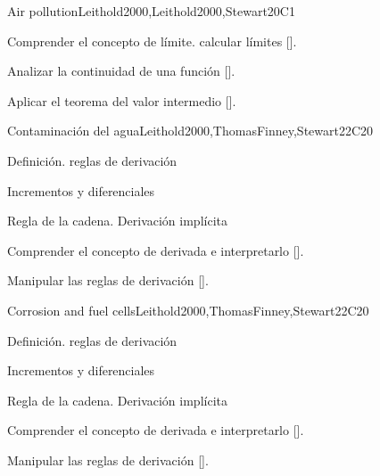 \begin{syllabus}
\begin{unit}{}{Air pollution}{Leithold2000,Leithold2000,Stewart}{20}{C1}
   \begin{learningoutcomes}
      \item Comprender el concepto de límite. calcular límites [\Assessment].
      \item Analizar la continuidad de una función [\Assessment].
      \item Aplicar el teorema del valor intermedio [\Assessment].
      \end{learningoutcomes}
\end{unit}

\begin{unit}{}{Contaminación del agua}{Leithold2000,ThomasFinney,Stewart}{22}{C20}
   \begin{topics}
      \item Definición. reglas de derivación
      \item Incrementos y diferenciales
      \item Regla de la cadena. Derivación implícita

   \end{topics}

   \begin{learningoutcomes}
      \item Comprender el concepto de derivada e interpretarlo [\Assessment].
      \item Manipular las reglas de derivación [\Assessment].
      \end{learningoutcomes}
\end{unit}


\begin{unit}{}{Corrosion and fuel cells}{Leithold2000,ThomasFinney,Stewart}{22}{C20}
   \begin{topics}
      \item Definición. reglas de derivación
      \item Incrementos y diferenciales
      \item Regla de la cadena. Derivación implícita

   \end{topics}

   \begin{learningoutcomes}
      \item Comprender el concepto de derivada e interpretarlo [\Assessment].
      \item Manipular las reglas de derivación [\Assessment].
      \end{learningoutcomes}
\end{unit}



\begin{coursebibliography}
\end{coursebibliography}

\end{syllabus}

%
